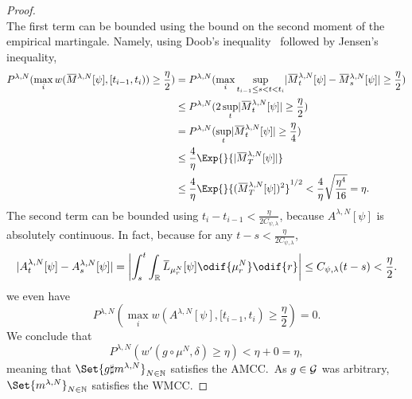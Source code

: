 \begin{proof}
\begin{equation}
  \end{equation}
  The first term can be bounded using the bound on the second moment of the empirical martingale.
  Namely, using Doob's inequality~\cite[64]{ethierMarkovProcessesCharacterization1985} followed by Jensen's inequality,
  \begin{equation}
    \begin{split}
      P^{\lambda, N}( \max_i w(\ol{M}^{\lambda, N}[\psi], [t_{i-1}, t_i)) \geq \frac{\eta}{2} )
       & = P^{\lambda, N}( \max_i \sup_{t_{i-1} \leq s < t < t_i} \abs{ \ol{M}_t^{\lambda, N}[\psi] - \ol{M}_s^{\lambda, N}[\psi] } \geq \frac{\eta}{2} ) \\
       & \leq P^{\lambda, N}( 2 \sup_{t} \abs{ \ol{M}_t^{\lambda, N}[\psi] } \geq \frac{\eta}{2} )                                                        \\
       & = P^{\lambda, N}( \sup_{t} \abs{ \ol{M}_t^{\lambda, N}[\psi] } \geq \frac{\eta}{4} )                                                             \\
       & \leq \frac{4}{\eta} \Exp{}{\abs{ \ol{M}_T^{\lambda, N}[\psi] }}                                                                                  \\
       & \leq \frac{4}{\eta} \Exp{}{ ( \ol{M}_T^{\lambda, N}[\psi] )^2 }^{1/2}
      < \frac{4}{\eta} \sqrt{\frac{\eta^4}{16}}
      = \eta.
    \end{split}
  \end{equation}
  The second term can be bounded using \( t_i - t_{i-1} < \frac{\eta}{2C_{\psi, \lambda}} \), because \( A^{\lambda, N}[\psi] \) is absolutely continuous.
  In fact, because for any \( t - s < \frac{\eta}{2C_{\psi, \lambda}} \),
  \begin{equation}
    \abs{ A_t^{\lambda, N}[\psi] - A_s^{\lambda, N}[\psi] }
    = \abs*{ \int_s^t \int_{\potspace} \ol{L}_{\mu_r^N}[\psi] \odif{\mu_r^N} \odif{r} }
    \leq C_{\psi,\lambda} (t - s)
    < \frac{\eta}{2}.
  \end{equation}
  we even have
  \begin{equation}
    P^{\lambda, N}( \max_i w(A^{\lambda, N}[\psi], [t_{i-1}, t_i) \geq \frac{\eta}{2}) = 0.
  \end{equation}
  We conclude that
  \begin{equation}
    P^{\lambda, N} (w'(g \circ \mu^N, \delta) \geq \eta)
    < \eta + 0 = \eta,
  \end{equation}
  meaning that \( \Set{g \sharp \lawmu^{\lambda,N}}_{N \in \bN} \) satisfies the AMCC.\
  As \( g \in \mathcal{G} \) was arbitrary, \( \Set{\lawmu^{\lambda,N}}_{N \in \bN} \) satisfies the WMCC.


\end{proof}
